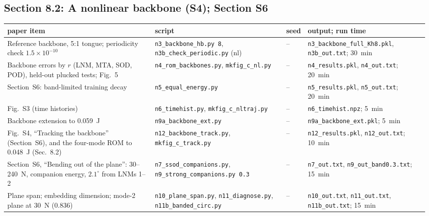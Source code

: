 \documentclass[10pt]{article}
\newcommand{\f}[1]{\texttt{#1}}
\begin{document}
\subsection*{Section 8.2: A nonlinear backbone (S4); Section S6}
\begin{longtable}{L{0.31\textwidth}L{0.25\textwidth}L{0.08\textwidth}L{0.25\textwidth}}
\toprule
paper item & script & seed & output; run time\\ \midrule
Reference backbone, 5:1 tongue; periodicity check $1.5\times10^{-10}$ & \f{n3\_\allowbreak{}backbone\_\allowbreak{}hb.py 8}, \f{n3b\_\allowbreak{}check\_\allowbreak{}periodic.py} (nl) & -- & \f{n3\_\allowbreak{}backbone\_\allowbreak{}full\_\allowbreak{}Kh8.pkl}, \f{n3b\_\allowbreak{}out.txt}; 30~min\\
Backbone errors by $r$ (LNM, MTA, SOD, POD), held-out plucked tests; Fig.~5 & \f{n4\_\allowbreak{}rom\_\allowbreak{}backbones.py}, \f{mkfig\_\allowbreak{}c\_\allowbreak{}nl.py} & -- & \f{n4\_\allowbreak{}results.pkl}, \f{n4\_\allowbreak{}out.txt}; 20~min\\
Section~S6: band-limited training decay & \f{n5\_\allowbreak{}equal\_\allowbreak{}energy.py} & -- & \f{n5\_\allowbreak{}results.pkl}, \f{n5\_\allowbreak{}out.txt}; 20~min\\
Fig.~S3 (time histories) & \f{n6\_\allowbreak{}timehist.py}, \f{mkfig\_\allowbreak{}c\_\allowbreak{}nltraj.py} & -- & \f{n6\_\allowbreak{}timehist.npz}; 5~min\\
Backbone extension to 0.059~J & \f{n9a\_\allowbreak{}backbone\_\allowbreak{}ext.py} & -- & \f{n9a\_\allowbreak{}backbone\_\allowbreak{}ext.pkl}; 5~min\\
Fig.~S4, ``Tracking the backbone'' (Section~S6), and the four-mode ROM to 0.048~J (Sec.~8.2) & \f{n12\_\allowbreak{}backbone\_\allowbreak{}track.py}, \f{mkfig\_\allowbreak{}c\_\allowbreak{}track.py} & -- & \f{n12\_\allowbreak{}results.pkl}, \f{n12\_\allowbreak{}out.txt}; 10~min\\
Section~S6, ``Bending out of the plane'': 30--240~N, companion energy, $2.1^\circ$ from LNMs 1--2 & \f{n7\_\allowbreak{}ssod\_\allowbreak{}companions.py}, \f{n9\_\allowbreak{}strong\_\allowbreak{}companions.py 0.3} & -- & \f{n7\_\allowbreak{}out.txt}, \f{n9\_\allowbreak{}out\_\allowbreak{}band0.3.txt}; 15~min\\
Plane span; embedding dimension; mode-2 plane at 30~N (0.836) & \f{n10\_\allowbreak{}plane\_\allowbreak{}span.py}, \f{n11\_\allowbreak{}diagnose.py}, \f{n11b\_\allowbreak{}banded\_\allowbreak{}circ.py} & -- & \f{n10\_\allowbreak{}out.txt}, \f{n11\_\allowbreak{}out.txt}, \f{n11b\_\allowbreak{}out.txt}; 15~min\\

\end{longtable}
\end{document}

